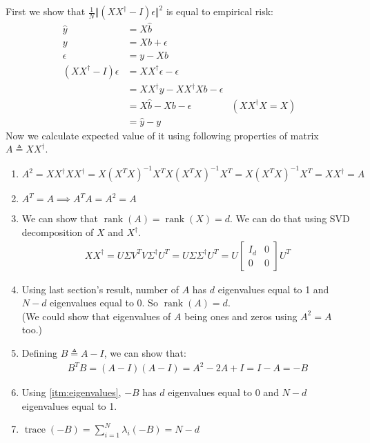\documentclass[]{article}
\numberwithin{equation}{section}
\DeclareMathOperator*{\trace}{trace}
\DeclareMathOperator*{\rank}{rank}
\newcommand{\norm}[2][]{\Vert #2\Vert_{#1}}
\newcommand{\transpose}{^T}
\begin{document}
\subsection{}
First we show that \(\frac{1}{N}\norm{(XX^{\dagger} -I)\epsilon}^2\) is equal to empirical risk:
\begin{align}
\hat{y} &= X\hat{b}\\
y &= Xb + \epsilon \\
\epsilon &= y - Xb \\
(XX^{\dagger} -I)\epsilon &= XX^{\dagger}\epsilon - \epsilon\\
&= XX^\dagger y - XX^\dagger Xb - \epsilon\\
&= X\hat{b} - Xb - \epsilon & (XX^\dagger X = X)\\
&= \hat{y} - y
\end{align}
Now we calculate expected value of it using following properties of matrix \(A \triangleq XX^\dagger\).
\begin{enumerate}
\item \(A^2 = XX^\dagger XX^\dagger = X(X\transpose X)^{-1} X\transpose X (X\transpose X)^{-1} X\transpose = X (X\transpose X)^{-1} X\transpose = X X^\dagger = A\)
\item \(A\transpose = A \implies A\transpose A = A^2 = A\)
\item We can show that \(\rank(A)=\rank(X)=d \). We can do that using SVD decomposition of \(X\) and \(X^\dagger\).
\begin{gather}
XX^\dagger = U\Sigma V\transpose V \Sigma ^\dagger U\transpose = U\Sigma \Sigma ^\dagger U\transpose = U \begin{bmatrix}
    I_d & 0 \\
    0 & 0
\end{bmatrix} U\transpose
\end{gather}
\item Using last section's result, number of \(A\) has \(d\) eigenvalues equal to 1 and \(N-d\) eigenvalues equal to 0. So \(\rank(A) = d\).
\label{itm:eigenvalues}\\
(We could show that eigenvalues of \(A\) being ones and zeros using \(A^2 = A\) too.)
\item Defining \(B \triangleq A - I\), we can show that: 
\begin{align}
B\transpose B = (A - I)(A - I) = A^2 - 2A + I = I - A = -B
\end{align}
\item Using \ref{itm:eigenvalues}, \(-B\) has \(d\) eigenvalues equal to 0 and \(N-d\) eigenvalues equal to 1.
\item \(\trace(-B) = \sum_{i=1}^{N} \lambda_i(-B) = N - d\)
\end{enumerate}
\end{document}
